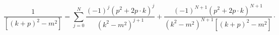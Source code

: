 \begin{equation}
\frac{1}{[(k+p)^{2}-m^{2}]}=\sum_{j=0}^{N}\frac{\left( -1\right) ^{j}\left(
p^{2}+2p\cdot k\right) ^{j}}{\left( k^{2}-m^{2}\right) ^{j+1}}+\frac{\left(
-1\right) ^{N+1}\left( p^{2}+2p\cdot k\right) ^{N+1}}{\left(
k^{2}-m^{2}\right) ^{N+1}[\left( k+p\right) ^{2}-m^{2}]}\cdot   \label{2}
\end{equation}

